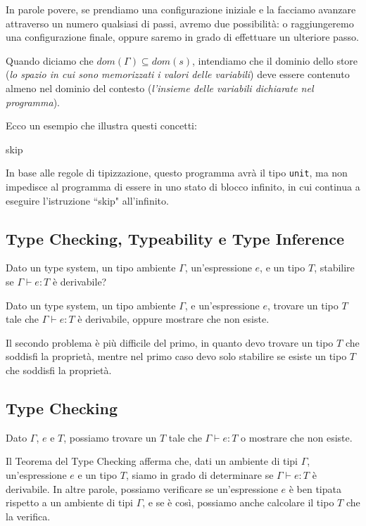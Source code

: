 In parole povere, se prendiamo una configurazione
iniziale e la facciamo avanzare attraverso un numero qualsiasi di passi, avremo due possibilità: o raggiungeremo una
configurazione finale, oppure saremo in grado di effettuare un ulteriore passo.

Quando diciamo che $dom(\Gamma) \subseteq dom(s)$, intendiamo che il dominio dello store (\textit{lo spazio
in cui sono memorizzati i valori delle variabili}) deve essere contenuto almeno nel dominio del contesto
(\textit{l'insieme delle variabili dichiarate nel programma}).

Ecco un esempio che illustra questi concetti:

\begin{algorithm}[H]
  {skip}
\end{algorithm}

In base alle regole di tipizzazione, questo programma avrà il tipo \texttt{unit},
ma non impedisce al programma di essere in uno stato di blocco infinito,
in cui continua a eseguire l'istruzione ``skip" all'infinito.


\subsection{Type Checking, Typeability e Type Inference}

\begin{tcolorbox}[title = {Problema del Controllo di Tipo}]
  Dato un type system, un tipo ambiente $\Gamma$, un'espressione $e$, e un tipo $T$, stabilire se $\Gamma \vdash e : T$ è derivabile?
\end{tcolorbox}

\begin{tcolorbox}[title = {Problema di Type Inference}]
  Dato un type system, un tipo ambiente $\Gamma$, e un'espressione $e$, trovare un tipo $T$ tale che $\Gamma \vdash e : T$ è
  derivabile, oppure mostrare che non esiste.
\end{tcolorbox}

Il secondo problema è più difficile del primo, in quanto devo trovare un tipo $T$ che soddisfi la proprietà, mentre nel primo
caso devo solo stabilire se esiste un tipo $T$ che soddisfi la proprietà.

\subsection{Type Checking}
\begin{tcolorbox}
  Dato $\Gamma$, $e$ e $T$, possiamo trovare un $T$ tale che $\Gamma \vdash e : T$ o mostrare che non esiste.
\end{tcolorbox}
Il Teorema del Type Checking afferma che, dati un ambiente di tipi $\Gamma$, un'espressione $e$ e un tipo $T$, siamo in
grado di determinare se $\Gamma \vdash e : T$ è derivabile. In altre parole, possiamo verificare se un'espressione $e$ è ben
tipata rispetto a un ambiente di tipi $\Gamma$, e se è così, possiamo anche calcolare il tipo $T$ che la verifica.

